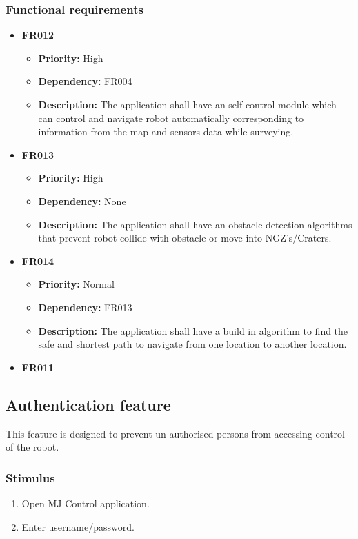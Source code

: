 \documentclass[10pt,a4paper,titlepage]{article}
\begin{document}
	\subsubsection*{Functional requirements}
	\begin{itemize}
		
		
		\item \textbf{FR012} 
		\begin{itemize}
			\item \textbf{Priority:} High
			\item \textbf{Dependency:} FR004
			\item \textbf{Description:} The application shall have an self-control module which can control and navigate robot automatically corresponding to information from the map and sensors data while surveying.
		\end{itemize}
		\item \textbf{FR013} 
		\begin{itemize}
		\item \textbf{Priority:} High
		\item \textbf{Dependency:} None
		\item \textbf{Description:} The application shall have an obstacle detection algorithms that prevent robot collide with obstacle or move into NGZ's/Craters.
		\end{itemize}
	
		\item \textbf{FR014} 
		\begin{itemize}
			\item \textbf{Priority:} Normal
			\item \textbf{Dependency:} FR013
			\item \textbf{Description:} The application shall have a build in algorithm to find the safe and shortest path to navigate from one location to another location.
		\end{itemize}
		\item \textbf{FR011}
	
	\end{itemize}
	
	\subsection{Authentication feature }
	\text This feature is designed to prevent un-authorised persons from accessing control of the robot.
	
	\subsubsection*{Stimulus}
	\begin{enumerate}
		\item Open MJ Control application.
		\item Enter username/password.
	\end{enumerate}
	
\end{document}
